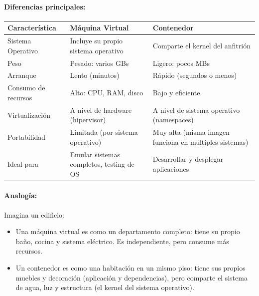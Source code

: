 \paragraph{Diferencias principales:}
\begin{table}[h!]
\centering
\begin{tabular}{|p{5cm}|p{5cm}|p{5cm}|}
\hline
\textbf{Característica}         & \textbf{Máquina Virtual}                     & \textbf{Contenedor}                     \\ \hline
Sistema Operativo               & Incluye su propio sistema operativo          & Comparte el kernel del anfitrión         \\ \hline
Peso                            & Pesado: varios GBs                           & Ligero: pocos MBs                        \\ \hline
Arranque                        & Lento (minutos)                              & Rápido (segundos o menos)                \\ \hline
Consumo de recursos             & Alto: CPU, RAM, disco                        & Bajo y eficiente                         \\ \hline
Virtualización                  & A nivel de hardware (hipervisor)             & A nivel de sistema operativo (namespaces) \\ \hline
Portabilidad                    & Limitada (por sistema operativo)             & Muy alta (misma imagen funciona en múltiples sistemas) \\ \hline
Ideal para                      & Emular sistemas completos, testing de OS     & Desarrollar y desplegar aplicaciones     \\ \hline
\end{tabular}
\end{table}

\paragraph{Analogía:}
Imagina un edificio:
\begin{itemize}
    \item Una máquina virtual es como un departamento completo: tiene su propio baño, cocina y sistema eléctrico. Es independiente, pero consume más recursos.
    \item Un contenedor es como una habitación en un mismo piso: tiene sus propios muebles y decoración (aplicación y dependencias), pero comparte el sistema de agua, luz y estructura (el kernel del sistema operativo).
\end{itemize}

